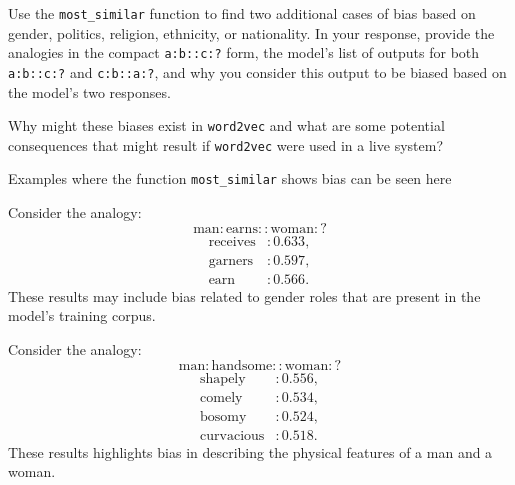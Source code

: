 \documentclass[a4paper,10pt]{article}
\begin{document}
\vspace{5pt}
\begin{taskbox}
 Use the \texttt{most\_similar} function to find two additional cases of bias based on gender, politics, religion, ethnicity, or nationality. In your response, provide the analogies in the compact \texttt{a:b::c:?} form, the model's list of outputs for both \texttt{a:b::c:?} and \texttt{c:b::a:?}, and why you consider this output to be biased based on the model's two responses.


 Why might these biases exist in \texttt{word2vec} and what are some potential consequences that might result if \texttt{word2vec} were used in a live system?
\end{taskbox}
\vspace{5pt}
\begin{answerbox}
    Examples where the function \texttt{most\_similar} shows bias can be seen here\\
    \end{answerbox}
    \begin{answerbox}
        
    Consider the analogy:
\[
\text{man} : \text{earns} :: \text{woman} : ?
\]
\begin{align*}
    \text{receives} & : 0.633, \\
    \text{garners} & : 0.597, \\
    \text{earn} & : 0.566.
\end{align*}
These results may include bias related to gender roles that are present in the model's training corpus.\\
\end{answerbox}
\begin{answerbox}
Consider the analogy:
\[
\text{man} : \text{handsome} :: \text{woman} : ?
\]
\begin{align*}
    \text{shapely} & : 0.556, \\
    \text{comely} & : 0.534, \\
    \text{bosomy} & : 0.524, \\
    \text{curvacious} & : 0.518.
\end{align*}
These results highlights bias in describing the physical features of a man and a woman.
\end{answerbox}
\end{document}
